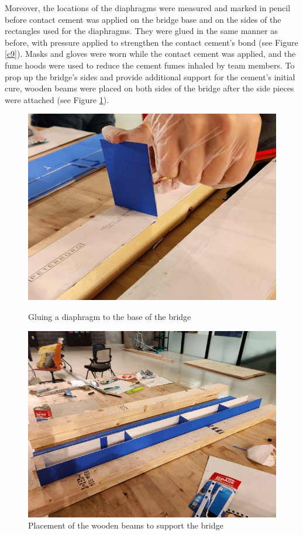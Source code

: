 \documentclass[11pt]{article}
\begin{document}
Moreover, the locations of the diaphragms were measured and marked in pencil before contact cement was applied on the bridge base and on the sides of the rectangles used for the diaphragms. They were glued in the same manner as before, with pressure applied to strengthen the contact cement's bond (see Figure \ref{c9}). Masks and gloves were worn while the contact cement was applied, and the fume hoods were used to reduce the cement fumes inhaled by team members. To prop up the bridge's sides and provide additional support for the cement's initial cure, wooden beams were placed on both sides of the bridge after the side pieces were attached (see Figure \ref{c10}).

\begin{figure}[h]
    \centering
    \begin{minipage}[t]{.49\textwidth}
        \centering
        \includegraphics[width=\textwidth]{img/construction_9.jpg}
        \caption{Gluing a diaphragm to the base of the bridge}
        \label{c9}
    \end{minipage}
    \hfill
    \begin{minipage}[t]{.49\textwidth}
        \centering
        \includegraphics[width=\textwidth]{img/construction_10.jpg}
        \caption{Placement of the wooden beams to support the bridge}
        \label{c10}
    \end{minipage}
\end{figure}
\end{document}
